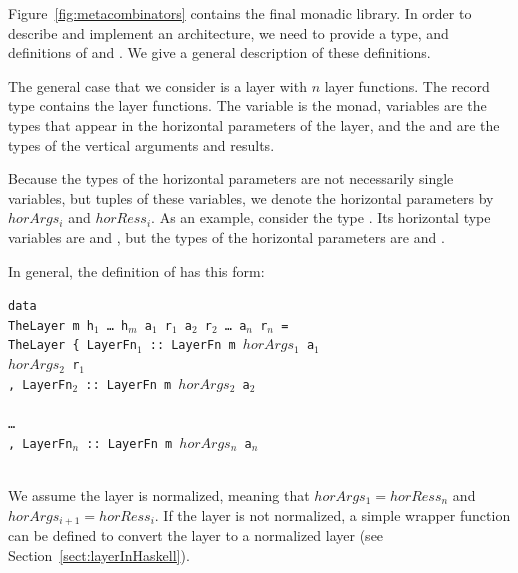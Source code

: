 \documentclass[preprint,natbib]{sigplanconf}
\begin{document}
Figure~\ref{fig:metacombinators} contains the final monadic library. In order to describe and implement an architecture, we need to provide a  type, and definitions of  and . We give a general description of these definitions.




The general case that we consider is a layer with $n$ layer functions. The record type  contains the layer functions. The variable  is the monad, variables  are the types that appear in the horizontal parameters of the layer, and the  and  are the types of the vertical arguments and results. 

Because the types of the horizontal parameters are not necessarily single  variables, but tuples of these variables, we denote the horizontal parameters by $horArgs_i$ and $horRess_i$. As an example, consider the type . Its horizontal  type variables are  and , but the types of the horizontal parameters are  and . 

In general, the definition of  has this form:

\begin{small}
\begin{tabbing}
{\tt da}\={\tt ta}\\
\> {\tt Th}\={\tt eLayer~m h$_1$ \dots ~h$_m$ a$_1$ r$_1$ a$_2$ r$_2$ \dots ~a$_n$ r$_n$ = }\\
\> \> {\tt TheLayer~}\={\tt \{~LayerFn$_1$}\verb| :: |{\tt LayerFn~m~}\= {\tt $horArgs_1$ a$_1$}\\
\> \>                \>                                             \> {\tt $horArgs_2$ r$_1$}\\
\>\>\> {\tt , LayerFn$_2$}\verb| :: |{\tt LayerFn~m~}\={\tt $horArgs_2$ a$_2$}\\
\> \>                \>                            \\
\>\>\> {\tt \dots }\\
\>\>\> {\tt , LayerFn$_n$}\verb| :: |{\tt LayerFn~m~}\={\tt $horArgs_{n}$ a$_n$}\\
\> \>                \>                            \\
\end{tabbing}
\end{small}

We assume the layer is normalized, meaning that $horArgs_{1} = horRess_n$ and 
$horArgs_{i+1} = horRess_i$. If the layer is not normalized, a simple wrapper function can be defined to convert the layer to a normalized layer (see Section~\ref{sect:layerInHaskell}). 
\end{document}
